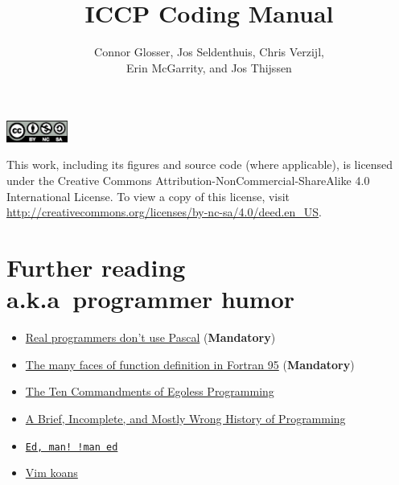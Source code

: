 \documentclass[nofonts, notoc, debug]{tufte-book}
\title{ICCP Coding Manual}
\author{Connor Glosser, Jos Seldenthuis, Chris Verzijl, \\ 
  Erin McGarrity, and Jos Thijssen}
\newcommand{\Chapter}[2]{\chapter[#1]{#1\\[1ex]\Large#2}}
\begin{document}
\maketitle

\pagestyle{empty}

\newpage
\null
\vfill
\begin{center}
  \includegraphics[width=0.15\textwidth]{figures/by-nc-sa.eps}
\end{center}
This work, including its figures and source code (where applicable), is
licensed under the Creative Commons Attribution-NonCommercial-ShareAlike 4.0
International License.  To view a copy of this license, visit
\url{http://creativecommons.org/licenses/by-nc-sa/4.0/deed.en_US}.

\pagestyle{fancy}

\tableofcontents


\mainmatter







\appendix




\backmatter
\Chapter{Further reading}{a.k.a\ programmer humor}
\begin{itemize}
  \item \href{http://www.pbm.com/~lindahl/real.programmers.html}{Real programmers don't use Pascal} (\textbf{Mandatory})
  \item \href{https://gist.github.com/alanbriolat/3135713#file-fortran_hell-f95}{The many faces of function definition in Fortran 95} (\textbf{Mandatory})
  \item \href{http://www.codinghorror.com/blog/2006/05/the-ten-commandments-of-egoless-programming.html}{The Ten Commandments of Egoless Programming}
  \item \href{http://james-iry.blogspot.com/2009/05/brief-incomplete-and-mostly-wrong.html}{A Brief, Incomplete, and Mostly Wrong History of Programming}
  \item \href{https://www.gnu.org/fun/jokes/ed-msg.html}{\texttt{Ed, man! !man ed}}
  \item \href{http://blog.sanctum.geek.nz/vim-koans/}{Vim koans}
\end{itemize}

\printindex
\end{document}
